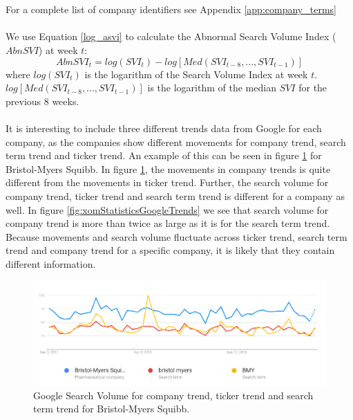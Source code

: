 \\\\
For a complete list of company identifiers see Appendix \ref{app:company_terms}
\\\\
We use Equation \eqref{log_asvi} to calculate the Abnormal Search Volume Index ($AbnSVI$) at week $t$:
\begin{equation}
   \label{log_asvi} 
   AbnSVI_{t} = log(SVI_{t}) - log[Med(SVI_{t-8},...,SVI_{t-1})] 
\end{equation}
where $log(SVI_{t})$ is the logarithm of the Search Volume Index at week $t$. $log[Med(SVI_{t-8},...,SVI_{t-1})]$ is the logarithm of the median $SVI$ for the previous 8 weeks.
\\\\
It is interesting to include three different trends data from Google for each company, as the companies show different movements for company trend, search term trend and ticker trend. An example of this can be seen in figure \ref{fig:bmyStatisticsGoogleTrends} for Bristol-Myers Squibb. In figure \ref{fig:bmyStatisticsGoogleTrends}, the movements in company trends is quite different from the movements in ticker trend. Further, the search volume for company trend, ticker trend and search term trend is different for a company as well. In figure \ref{fig:xomStatisticsGoogleTrends} we see that search volume for company trend is more than twice as large as it is for the search term trend. Because movements and search volume fluctuate across ticker trend, search term trend and company trend for a specific company, it is likely that they contain different information.   
\begin{figure}[h!]
  \centering
    \includegraphics[width=1\textwidth]{fig/bmyStatisticsGoogleTrendsAddedExplanation.png}
 \caption{Google Search Volume for company trend, ticker trend and search term trend for Bristol-Myers Squibb.}
\label{fig:bmyStatisticsGoogleTrends}
\end{figure}
